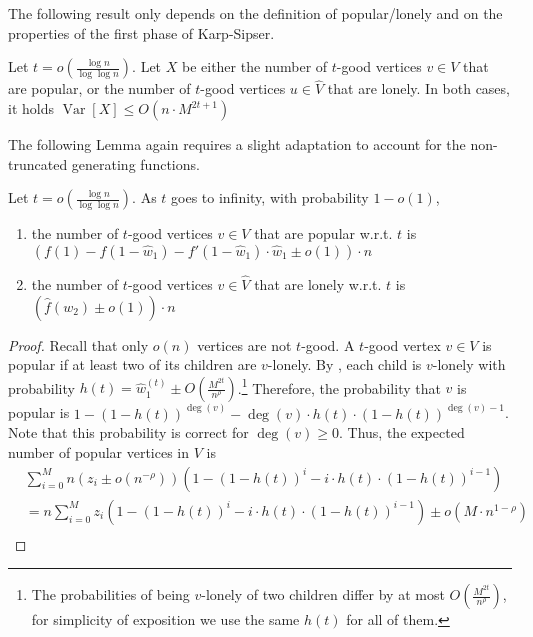 \documentclass[11pt]{article}
\DeclareMathOperator*{\Var}{Var}
\newcommand{\maxdeg}{M}
\begin{document}
\begin{toappendix}
The following result only depends on the definition of popular/lonely and on the properties of the first phase of Karp-Sipser.
\begin{lemma}\label{lem:bg-concentration-3-7}
Let $t=o\left(\frac{\log n}{\log \log n}\right)$. Let $X$ be either the number of $t$-good vertices $v\in V$ that are popular, or the number of $t$-good vertices $u\in \hat{V}$ that are lonely. In both cases, it holds $\Var[X] \leq O(n\cdot \maxdeg^{2t+1})$
\end{lemma}

The following Lemma again requires a slight adaptation to account for the non-truncated generating functions. 

\begin{lemma}\label{lem:bg-3-7}
Let $t=o\left(\frac{\log n}{\log\log n}\right)$. As $t$ goes to infinity, with probability $1-o(1)$, 
\begin{enumerate}
\item the number of $t$-good vertices $v\in V$ that are popular w.r.t. $t$ is $(f(1) - f(1-\hat{w}_1) - f'(1-\hat{w}_1)\cdot \hat{w}_1 \pm o(1))\cdot n$ 
\item the number of $t$-good vertices $v\in \hat{V}$ that are lonely w.r.t. $t$ is $(\hat{f}(w_2) \pm o(1))\cdot n$
\end{enumerate}
\end{lemma}
\begin{proof}
Recall that only $o(n)$ vertices are not $t$-good. A $t$-good vertex $v\in V$ is popular if at least two of its children are $v$-lonely. By , each child is $v$-lonely with probability $h(t)=\hat{w}_1^{(t)} \pm O\left(\frac{M^{2t}}{n^{\rho}}\right)$.\footnote{The probabilities of being $v$-lonely of two children differ by at most $O\left(\frac{M^{2t}}{n^{\rho}}\right)$, for simplicity of exposition we use the same $h(t)$ for all of them.} Therefore, the probability that $v$ is popular is $1 - \left(1 - h(t)\right)^{\deg(v)} - \deg(v) \cdot h(t) \cdot \left(1 - h(t)\right)^{\deg(v)-1}$. Note that this probability is correct for $\deg(v)\geq 0$. Thus, the expected number of popular vertices in $V$ is
\begin{align*}
&\sum_{i=0}^{\maxdeg} n (z_i \pm o(n^{-\rho})) \left(1 - \left(1 - h(t)\right)^{i} - i \cdot h(t) \cdot \left(1 - h(t)\right)^{i-1} \right) \\
&= n\sum_{i=0}^{\maxdeg} z_i\left(1 - \left(1 - h(t)\right)^{i} - i \cdot h(t) \cdot \left(1 - h(t)\right)^{i-1} \right) \pm o(\maxdeg\cdot n^{1-\rho})\\

\end{align*}
\end{proof}
\end{toappendix}
\end{document}
